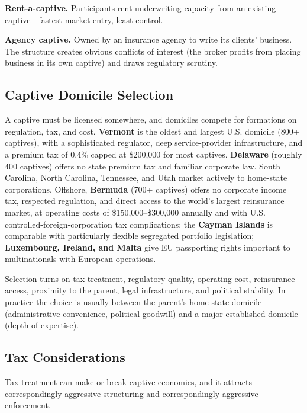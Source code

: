 \documentclass[11pt,openany]{book}
\begin{document}
\textbf{Rent-a-captive.} Participants rent underwriting capacity from an
existing captive---fastest market entry, least control.

\textbf{Agency captive.} Owned by an insurance agency to write its clients'
business. The structure creates obvious conflicts of interest (the broker
profits from placing business in its own captive) and draws regulatory
scrutiny.

\subsection{Captive Domicile Selection}

A captive must be licensed somewhere, and domiciles compete for formations on
regulation, tax, and cost. \textbf{Vermont} is the oldest and largest U.S.
domicile (800+ captives), with a sophisticated regulator, deep
service-provider infrastructure, and a premium tax of 0.4\% capped at
\$200,000 for most captives. \textbf{Delaware} (roughly 400 captives) offers
no state premium tax and familiar corporate law. South Carolina, North
Carolina, Tennessee, and Utah market actively to home-state corporations.
Offshore, \textbf{Bermuda} (700+ captives) offers no corporate income tax,
respected regulation, and direct access to the world's largest reinsurance
market, at operating costs of \$150,000--\$300,000 annually and with U.S.
controlled-foreign-corporation tax complications; the \textbf{Cayman Islands}
is comparable with particularly flexible segregated portfolio legislation;
\textbf{Luxembourg, Ireland, and Malta} give EU passporting rights important
to multinationals with European operations.

Selection turns on tax treatment, regulatory quality, operating cost,
reinsurance access, proximity to the parent, legal infrastructure, and
political stability. In practice the choice is usually between the parent's
home-state domicile (administrative convenience, political goodwill) and a
major established domicile (depth of expertise).

\subsection{Tax Considerations}
\label{subsec:captive-tax}

Tax treatment can make or break captive economics, and it attracts
correspondingly aggressive structuring and correspondingly aggressive
enforcement.
\end{document}
